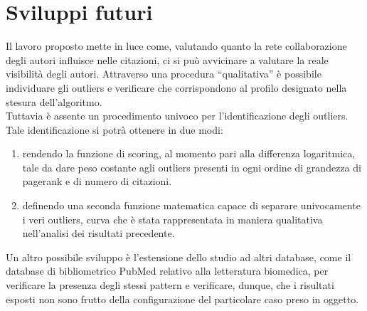 \documentclass[a4paper, 12pt]{article}
\let\oldsection\section
\renewcommand\section{\clearpage\oldsection}
\begin{document}
\section{Sviluppi futuri}
Il lavoro proposto mette in luce come, valutando quanto la rete collaborazione degli autori influisce nelle citazioni, ci si può avvicinare a valutare la reale visibilità degli autori.
Attraverso una procedura ``qualitativa'' è possibile individuare gli outliers e verificare che corrispondono al profilo designato nella stesura dell'algoritmo. \\
Tuttavia è assente un procedimento univoco per l'identificazione degli outliers. Tale identificazione si potrà ottenere in due modi: \begin{enumerate}
  \item rendendo la funzione di scoring, al momento pari alla differenza logaritmica, tale da dare peso costante agli outliers presenti in ogni ordine di grandezza di pagerank e di numero di citazioni.
  \item definendo una seconda funzione matematica capace di separare univocamente i veri outliers, curva che è stata rappresentata in maniera qualitativa nell'analisi dei risultati precedente.
\end{enumerate}
Un altro possibile sviluppo è l'estensione dello studio ad altri database, come il database di bibliometrico PubMed relativo alla letteratura biomedica, per verificare la presenza degli stessi pattern e verificare, dunque, che i risultati esposti non sono frutto della configurazione del particolare caso preso in oggetto.



\end{document}
